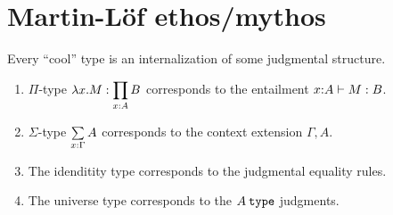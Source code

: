 \documentclass[11pt]{article}
\begin{document}
\section{Martin-L\"of ethos/mythos}
Every ``cool'' type is an internalization of some judgmental structure.
\begin{enumerate}
\item $\Pi$-type $\oftype{\lam{x}{M}}{\displaystyle\prod_{x{:}A}B}$
  corresponds to the entailment $\oftype{x{:}A}{M}{B}$.
\item $\Sigma$-type $\dpairtype{x}{\Gamma}{A}$
  corresponds to the context extension $\Gamma, {A}$.
\item The idenditity type corresponds to the judgmental equality rules.
\item The universe type corresponds to the $\istype{A}$ judgments.
\end{enumerate}
\end{document}
